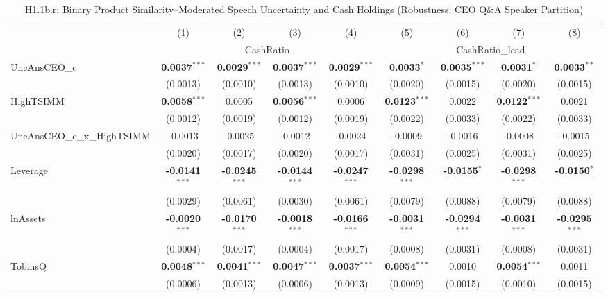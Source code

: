 \documentclass[11pt,a4paper]{article}
\begin{document}
\begin{table}[htbp]
\centering
\caption{H1.1b.r: Binary Product Similarity--Moderated Speech Uncertainty and Cash Holdings (Robustness: CEO Q\&A Speaker Partition)}
\label{tab:h1_1b_robust}
\scriptsize
\begin{tabular}{lcccccccc}
\toprule
 & (1) & (2) & (3) & (4) & (5) & (6) & (7) & (8) \\
 & \multicolumn{4}{c}{CashRatio} & \multicolumn{4}{c}{CashRatio\_lead} \\
\cmidrule(lr){2-5} \cmidrule(lr){6-9}
\midrule
UncAnsCEO\_c & \textbf{0.0037}$^{***}$ & \textbf{0.0029}$^{***}$ & \textbf{0.0037}$^{***}$ & \textbf{0.0029}$^{***}$ & \textbf{0.0033}$^{*}$ & \textbf{0.0035}$^{***}$ & \textbf{0.0031}$^{*}$ & \textbf{0.0033}$^{**}$ \\
 & (0.0013) & (0.0010) & (0.0013) & (0.0010) & (0.0020) & (0.0015) & (0.0020) & (0.0015) \\
HighTSIMM & \textbf{0.0058}$^{***}$ & 0.0005 & \textbf{0.0056}$^{***}$ & 0.0006 & \textbf{0.0123}$^{***}$ & 0.0022 & \textbf{0.0122}$^{***}$ & 0.0021 \\
 & (0.0012) & (0.0019) & (0.0012) & (0.0019) & (0.0022) & (0.0033) & (0.0022) & (0.0033) \\
UncAnsCEO\_c\_x\_HighTSIMM & -0.0013 & -0.0025 & -0.0012 & -0.0024 & -0.0009 & -0.0016 & -0.0008 & -0.0015 \\
 & (0.0020) & (0.0017) & (0.0020) & (0.0017) & (0.0031) & (0.0025) & (0.0031) & (0.0025) \\
\midrule
Leverage & \textbf{-0.0141}$^{***}$ & \textbf{-0.0245}$^{***}$ & \textbf{-0.0144}$^{***}$ & \textbf{-0.0247}$^{***}$ & \textbf{-0.0298}$^{***}$ & \textbf{-0.0155}$^{*}$ & \textbf{-0.0298}$^{***}$ & \textbf{-0.0150}$^{*}$ \\
 & (0.0029) & (0.0061) & (0.0030) & (0.0061) & (0.0079) & (0.0088) & (0.0079) & (0.0088) \\
lnAssets & \textbf{-0.0020}$^{***}$ & \textbf{-0.0170}$^{***}$ & \textbf{-0.0018}$^{***}$ & \textbf{-0.0166}$^{***}$ & \textbf{-0.0031}$^{***}$ & \textbf{-0.0294}$^{***}$ & \textbf{-0.0031}$^{***}$ & \textbf{-0.0295}$^{***}$ \\
 & (0.0004) & (0.0017) & (0.0004) & (0.0017) & (0.0008) & (0.0031) & (0.0008) & (0.0031) \\
TobinsQ & \textbf{0.0048}$^{***}$ & \textbf{0.0041}$^{***}$ & \textbf{0.0047}$^{***}$ & \textbf{0.0037}$^{***}$ & \textbf{0.0054}$^{***}$ & 0.0010 & \textbf{0.0054}$^{***}$ & 0.0011 \\
 & (0.0006) & (0.0013) & (0.0006) & (0.0013) & (0.0009) & (0.0015) & (0.0010) & (0.0015) \\

\end{tabular}
\end{table}
\end{document}
